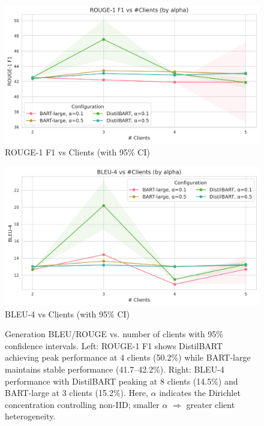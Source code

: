 \documentclass[conference]{IEEEtran}
\begin{document}
\begin{figure}[H]
    \centering
    \begin{minipage}[t]{0.48\textwidth}
        \centering
        \includegraphics[width=\linewidth]{../plots/generation/rouge1_vs_clients_combined.png}\\[-2pt]
        {\footnotesize ROUGE-1 F1 vs Clients (with 95\% CI)}
    \end{minipage}\hfill
    \begin{minipage}[t]{0.48\textwidth}
        \centering
        \includegraphics[width=\linewidth]{../plots/generation/bleu4_vs_clients_combined.png}\\[-2pt]
        {\footnotesize BLEU-4 vs Clients (with 95\% CI)}
    \end{minipage}
    \caption{Generation BLEU/ROUGE vs. number of clients with 95\% confidence intervals. Left: ROUGE-1 F1 shows DistilBART achieving peak performance at 4 clients (50.2\%) while BART-large maintains stable performance (41.7--42.2\%). Right: BLEU-4 performance with DistilBART peaking at 8 clients (14.5\%) and BART-large at 3 clients (15.2\%). Here, $\alpha$ indicates the Dirichlet concentration controlling non-IID; smaller $\alpha$ $\Rightarrow$ greater client heterogeneity.}
    \label{fig:gen_vs_clients}
\end{figure}
\end{document}

